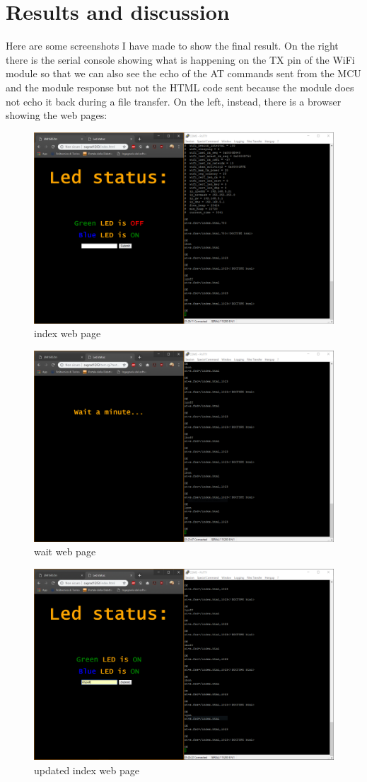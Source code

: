 \documentclass[peerreview]{IEEEtran}
\begin{document}
\section{Results and discussion} 
Here are some screenshots I have made to show the final result. On the right there is the serial console showing what is happening on the TX pin of the WiFi module so that we can also see the echo of the AT commands sent from the MCU and the module response but not the HTML code sent because the module does not echo it back during a file transfer. On the left, instead, there is a browser showing the web pages:
\begin{figure}[!h]
\centering
\includegraphics[width=0.8\columnwidth]{1}
\caption{index web page}
\label{fig_index}
\end{figure}
\begin{figure}[!h]
\centering
\includegraphics[width=0.8\columnwidth]{2}
\caption{wait web page}
\label{fig_wait}
\end{figure}
\begin{figure}[!h]
\centering
\includegraphics[width=0.8\columnwidth]{3}
\caption{updated index web page}
\label{fig_updated}
\end{figure}
\end{document}
